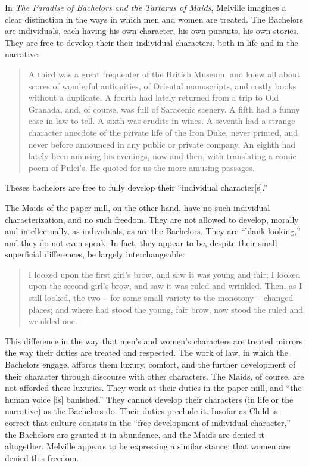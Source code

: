 \documentclass[man,12pt,natbib]{apa6}
\begin{document}
In \emph{The Paradise of Bachelors and the Tartarus of Maids}, Melville
imagines a clear distinction in the ways in which men and women are treated.
The Bachelors are individuals, each having his own character, his own pursuits,
his own stories. They are free to develop their their individual characters,
both in life and in the narrative:
\begin{quote}
	A third was a great frequenter of the British Museum, and knew all about
	scores of wonderful antiquities, of Oriental manuscripts, and costly books
	without a duplicate.  A fourth had lately returned from a trip to Old
	Granada, and, of course, was full of Saracenic scenery. A fifth had a funny
	case in law to tell. A sixth was erudite in wines. A seventh had a strange
	character anecdote of the private life of the Iron Duke, never
	printed, and never before announced in any public or private company. An
	eighth had lately been amusing his evenings, now and then, with translating
	a comic poem of Pulci's. He quoted for us the more amusing passages. 
\end{quote}
Theses bachelors are free to fully develop their ``individual character[s].''

The Maids of the paper mill, on the other hand, have no such individual
characterization, and no such freedom. They are not allowed to develop, morally and intellectually,
as individuals, as are the Bachelors. They are ``blank-looking,'' and they do
not even speak. In fact, they appear to be, despite their small superficial differences, be largely interchangeable:
\begin{quote}
	   I looked upon the first girl's brow, and saw it was young and fair; I
	   looked upon the second girl's brow, and saw it was ruled and wrinkled.
	   Then, as I still looked, the two -- for some small variety to the
	   monotony -- changed places; and where had stood the young, fair brow,
	   now stood the ruled and wrinkled one. 
\end{quote}

This difference in the way that men's and women's characters are treated
mirrors the way their duties are treated and respected. The work of law, in
which the Bachelors engage, affords them luxury, comfort, and the further
development of their character through discourse with other characters. The
Maids, of course, are not afforded these luxuries. They work at their duties in
the paper-mill, and ``the human voice [is] banished.'' They cannot develop
their characters (in life or the narrative) as the Bachelors do. Their duties
preclude it.  Insofar as Child is correct that culture consists in the ``free
development of individual character,'' the Bachelors are granted it in
abundance, and the Maids are denied it altogether. Melville appears to be
expressing a similar stance: that women are denied this freedom.
\end{document}
